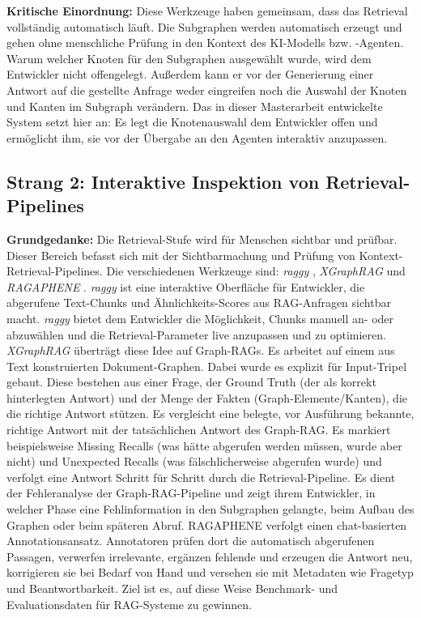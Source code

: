 \textbf{Kritische Einordnung:}
Diese Werkzeuge haben gemeinsam, dass das Retrieval vollständig automatisch läuft. Die Subgraphen werden automatisch erzeugt und gehen ohne menschliche Prüfung in den Kontext des KI-Modells bzw. -Agenten. Warum welcher Knoten für den Subgraphen ausgewählt wurde, wird dem Entwickler nicht offengelegt. Außerdem kann er vor der Generierung einer Antwort auf die gestellte Anfrage weder eingreifen noch die Auswahl der Knoten und Kanten im Subgraph verändern. Das in dieser Masterarbeit entwickelte System setzt hier an: Es legt die Knotenauswahl dem Entwickler offen und ermöglicht ihm, sie vor der Übergabe an den Agenten interaktiv anzupassen.

\subsection{Strang 2: Interaktive Inspektion von Retrieval-Pipelines}

\textbf{Grundgedanke:} Die Retrieval-Stufe wird für Menschen sichtbar und prüfbar.
Dieser Bereich befasst sich mit der Sichtbarmachung und Prüfung von Kontext-Retrieval-Pipelines. Die verschiedenen Werkzeuge sind: \textit{raggy} \parencite{romerolauro2025raggy}, \textit{XGraphRAG} \parencite{wang2025xgraphrag} und \textit{RAGAPHENE} \parencite{fadnis2025ragaphene}. \textit{raggy} ist eine interaktive Oberfläche für Entwickler, die abgerufene Text-Chunks und Ähnlichkeits-Scores aus RAG-Anfragen sichtbar macht. \textit{raggy} bietet dem Entwickler die Möglichkeit, Chunks manuell an- oder abzuwählen und die Retrieval-Parameter live anzupassen und zu optimieren. \textit{XGraphRAG} überträgt diese Idee auf Graph-RAGs. Es arbeitet auf einem aus Text konstruierten Dokument-Graphen. Dabei wurde es explizit für Input-Tripel gebaut. Diese bestehen aus einer Frage, der Ground Truth (der als korrekt hinterlegten Antwort) und der Menge der Fakten (Graph-Elemente/Kanten), die die richtige Antwort stützen. Es vergleicht eine belegte, vor Ausführung bekannte, richtige Antwort mit der tatsächlichen Antwort des Graph-RAG. Es markiert beispielsweise Missing Recalls (was hätte abgerufen werden müssen, wurde aber nicht) und Unexpected Recalls (was fälschlicherweise abgerufen wurde) und verfolgt eine Antwort Schritt für Schritt durch die Retrieval-Pipeline. Es dient der Fehleranalyse der Graph-RAG-Pipeline und zeigt ihrem Entwickler, in welcher Phase eine Fehlinformation in den Subgraphen gelangte, beim Aufbau des Graphen oder beim späteren Abruf. RAGAPHENE verfolgt einen chat-basierten Annotationsansatz. Annotatoren prüfen dort die automatisch abgerufenen Passagen, verwerfen irrelevante, ergänzen fehlende und erzeugen die Antwort neu, korrigieren sie bei Bedarf von Hand und versehen sie mit Metadaten wie Fragetyp und Beantwortbarkeit. Ziel ist es, auf diese Weise Benchmark- und Evaluationsdaten für RAG-Systeme zu gewinnen.

